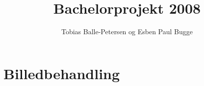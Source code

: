 \documentclass[10pt,a4paper,final]{report}
\author{Tobias Balle-Petersen og Esben Paul Bugge}
\title{Bachelorprojekt 2008}
\begin{document}
\maketitle
\section{Billedbehandling}
\end{document}
